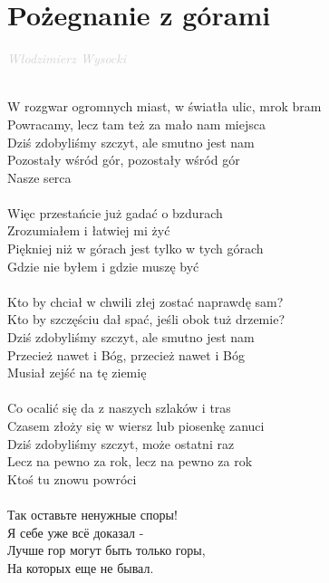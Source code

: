 \documentclass[a5paper, 10pt]{book}
\begin{document}
\section{Pożegnanie z górami}\textcolor{lightgray}{\textit{Włodzimierz Wysocki}}\\~\\
\begin{minipage}[t]{0.8\textwidth}
W rozgwar ogromnych miast, w światła ulic, mrok bram\\
Powracamy, lecz tam też za mało nam miejsca\\
Dziś zdobyliśmy szczyt, ale smutno jest nam\\
Pozostały wśród gór, pozostały wśród gór\\
Nasze serca\\
\\
\hspace*{3mm}Więc przestańcie już gadać o bzdurach\\
\hspace*{3mm}Zrozumiałem i łatwiej mi żyć\\
\hspace*{3mm}Piękniej niż w górach jest tylko w tych górach\\
\hspace*{3mm}Gdzie nie byłem i gdzie muszę być\\
\\
Kto by chciał w chwili złej zostać naprawdę sam?\\
Kto by szczęściu dał spać, jeśli obok tuż drzemie?\\
Dziś zdobyliśmy szczyt, ale smutno jest nam\\
Przecież nawet i Bóg, przecież nawet i Bóg\\
Musiał zejść na tę ziemię\\
\\
Co ocalić się da z naszych szlaków i tras\\
Czasem złoży się w wiersz lub piosenkę zanuci\\
Dziś zdobyliśmy szczyt, może ostatni raz\\
Lecz na pewno za rok, lecz na pewno za rok\\
Ktoś tu znowu powróci\\
\\
\foreignlanguage{russian}{
  \hspace*{5mm} Так оставьте ненужные споры!\\
  \hspace*{5mm} Я себе уже всё доказал -\\
  \hspace*{5mm} Лучше гор могут быть только горы,\\
  \hspace*{5mm} На которых еще не бывал.\\
}
\end{minipage}
\end{document}

